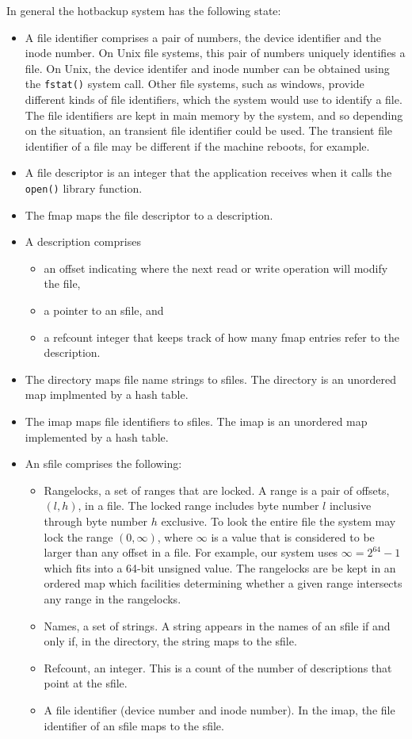 \documentclass[10pt]{article}
\begin{document}
In general the hotbackup system has the following state:
\begin{itemize}
\item A file identifier comprises a pair of numbers, the device
  identifier and the inode number.  On Unix file systems, this pair of
  numbers uniquely identifies a file.  On Unix, the device identifer
  and inode number can be obtained using the \texttt{fstat()} system
  call.  Other file systems, such as windows, provide different kinds
  of file identifiers, which the system would use to identify a file.
  The file identifiers are kept in main memory by the system, and so
  depending on the situation, an transient file identifier could be
  used.  The transient file identifier of a file may be different if
  the machine reboots, for example.
\item A file descriptor is an integer that the application receives
  when it calls the \texttt{open()} library function.
\item The fmap maps the file descriptor to a description.
\item A description comprises
 \begin{itemize}
  \item an offset indicating where the next read or write operation will modify the file,
  \item a pointer to an sfile, and
  \item a refcount integer that keeps track of how many fmap entries refer to the description.
 \end{itemize}
\item The directory maps file name strings to sfiles.  The directory is an unordered map implmented by a hash table.
\item The imap maps file identifiers to sfiles.  The imap is an unordered map implemented by a hash table.
\item An sfile comprises the following:
 \begin{itemize}
   \item Rangelocks, a set of ranges that are locked.  A range is a
     pair of offsets, $(l,h)$, in a file.  The locked range includes
     byte number $l$ inclusive through byte number $h$ exclusive.  To
     look the entire file the system may lock the range $(0, \infty)$,
     where $\infty$ is a value that is considered to be larger than
     any offset in a file.  For example, our system uses
     $\infty=2^{64}-1$ which fits into a 64-bit unsigned value.  The
     rangelocks are be kept in an ordered map which facilities
     determining whether a given range intersects any range in the
     rangelocks.
   \item Names, a set of strings.  A string appears in the names of an
     sfile if and only if, in the directory, the string maps to the
     sfile.
   \item Refcount, an integer.  This is a count of the number of descriptions that point at the sfile.
   \item A file identifier (device number and inode number).   In the imap, the file identifier of an sfile maps to the sfile.
 \end{itemize}
\end{itemize}
\end{document}
